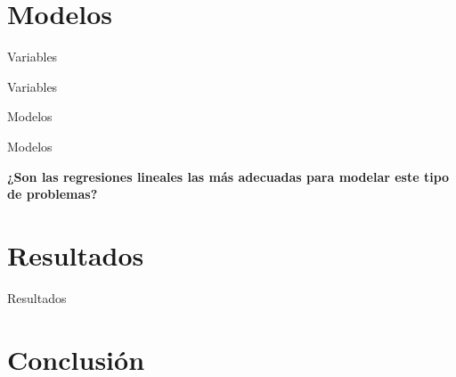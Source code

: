 \documentclass[10pt]{beamer}
\begin{document}
\section{Modelos}

\begin{frame}{Variables}



\end{frame}

\begin{frame}{Variables}




\end{frame}

\begin{frame}{Modelos}
\end{frame}

\begin{frame}{Modelos}
  \begin{center}
    \textbf{¿Son las regresiones lineales las más adecuadas para modelar este
      tipo de problemas?}
  \end{center}
\end{frame}

\section{Resultados}

\begin{frame}{Resultados}
\end{frame}

\section{Conclusión}
\end{document}
